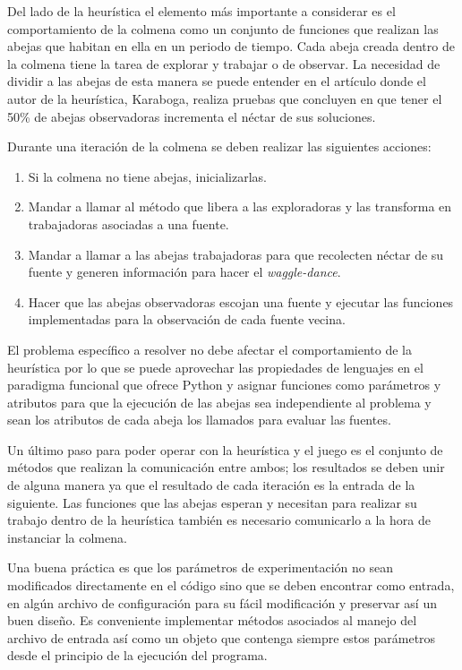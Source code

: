 Del lado de la heurística el elemento más importante a considerar es el 
comportamiento de la colmena como un conjunto de funciones que realizan 
las abejas que habitan en ella en un periodo de tiempo. Cada abeja 
creada dentro de la colmena tiene la tarea de explorar y trabajar o 
de observar. La necesidad de dividir a las abejas de esta manera se puede entender 
en el artículo \cite{karaboga2008performance} donde el autor de la heurística, 
Karaboga, realiza pruebas que concluyen en que tener el 50\% de abejas observadoras 
incrementa el néctar de sus soluciones. 

Durante una iteración de la colmena se deben realizar las siguientes acciones: 

\begin{enumerate}
\item Si la colmena no tiene abejas, inicializarlas.

\item Mandar a llamar al método que libera a las exploradoras y las transforma en 
trabajadoras asociadas a una fuente.

\item Mandar a llamar a las abejas trabajadoras para que recolecten néctar de su 
fuente y generen información para hacer el \textit{waggle-dance}.

\item Hacer que las abejas observadoras escojan una fuente y ejecutar las 
funciones implementadas para la observación de cada fuente vecina. 
 
\end{enumerate}

El problema específico a resolver no debe afectar el comportamiento de la 
heurística por lo que se puede aprovechar las propiedades de lenguajes en el 
paradigma funcional que ofrece 
Python y asignar funciones como parámetros y atributos para que la ejecución de las abejas 
sea independiente al problema y sean los atributos de cada abeja los 
llamados para evaluar las fuentes.

Un último paso para poder operar con la heurística y el juego es el conjunto 
de métodos que realizan la comunicación entre ambos; los resultados se deben unir de alguna 
manera ya que el resultado de cada iteración es la entrada de la 
siguiente. Las funciones que las abejas esperan y necesitan para realizar su 
trabajo dentro de la heurística también es necesario comunicarlo a la hora 
de instanciar la colmena.

Una buena práctica es que los parámetros de experimentación no sean modificados 
directamente en el código sino que se deben encontrar como entrada, en algún archivo 
de configuración para su fácil modificación y preservar así un buen diseño. Es 
conveniente implementar métodos asociados al manejo del archivo de entrada así como un objeto 
que contenga siempre estos parámetros desde el principio de la ejecución del programa.

